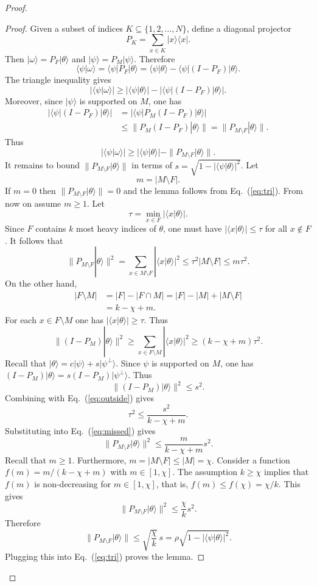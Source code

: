 \documentclass[
  reprint,            %
  amsmath,amssymb,
  aps,
  superscriptaddress, %
  longbibliography
]{revtex4-2}
\theoremstyle{definition}
\newcommand{\la}{\langle}
\newcommand{\ra}{\rangle}
\newcommand{\be}{\begin{equation}}
\newcommand{\ee}{\end{equation}}
\begin{document}
\begin{proof}
\begin{proof}
Given a subset of indices $K\subseteq \{1,2,\ldots,N\}$, define a diagonal projector
\[
P_K = \sum_{x\in K} |x\ra\la x|.
\]
Then $|\omega\ra = P_F|\theta\ra$ and $|\psi\ra = P_M|\psi\ra$.
Therefore
\[
\la \psi|\omega\ra = \la \psi|P_F|\theta\ra = \la \psi|\theta\ra - \la \psi|(I-P_F)|\theta\ra.
\]
The triangle inequality gives
\[
|\la \psi|\omega\ra| \ge |\la \psi|\theta\ra| - |\la \psi|(I-P_F)|\theta\ra|.
\]
Moreover, since $|\psi\ra$ is supported on $M$, one has
\begin{align*}
|\la \psi|(I-P_F)|\theta\ra|
& = |\la \psi|P_M(I-P_F)|\theta\ra|\\ 
& \le \|P_M(I-P_F)|\theta\ra\|
= \|P_{M\setminus F}|\theta\ra\|.
\end{align*}
Thus
\be
\label{eq:tri}
|\la \psi|\omega\ra| \ge |\la \psi|\theta\ra| - \|P_{M\setminus F}|\theta\ra\|.
\ee
It remains to bound $\|P_{M\setminus F}|\theta\ra\|$ in terms of $s=\sqrt{1-|\la \psi|\theta\ra|^2}$.
Let 
\[
m= |M\setminus F|.
\]
If $m=0$ then $\|P_{M\setminus F}|\theta\ra\|=0$ and the lemma follows  from Eq.~(\ref{eq:tri}).
From now on assume $m\ge 1$.
Let
\[
\tau= \min_{x\in F} |\la x|\theta\ra|.
\]
Since $F$ contains $k$ most heavy indices of $\theta$, one must have 
$|\la x|\theta\ra|\le \tau$ for all $x\notin F$.
It follows that
\be\label{eq:missed}
\|P_{M\setminus F}|\theta\ra\|^2 =\sum_{x\in M\setminus F} |\la x|\theta\ra|^2 \le \tau^2 |M\setminus F| \le  m \tau^2.
\ee
On the other hand, 
\begin{align*}
|F\setminus M| & = |F|-|F\cap M| = |F| -|M|+|M\setminus F| \\
& = k - \chi + m.
\end{align*}
For each  $x\in F \setminus M$ one has $|\la x|\theta\ra|\ge \tau$. Thus
\be
\label{eq:outside}
\|(I-P_M)|\theta\ra\|^2 \ge \sum_{x\in F\setminus M} |\la x|\theta\ra|^2 \ge (k-\chi+m)\tau^2.
\ee
Recall that $|\theta\ra = c|\psi\ra + s|\psi^\perp\ra$.
Since $\psi$ is supported on $M$, one has 
$(I-P_M)|\theta\ra = s (I-P_M)|\psi^\perp\ra$.
Thus
\[
\|(I-P_M)|\theta\ra\|^2 \le s^2.
\]
Combining with Eq.~(\ref{eq:outside}) gives
\[
\tau^2 \le \frac{s^2}{k-\chi+m}.
\]
Substituting into Eq.~(\ref{eq:missed}) gives
\[
\|P_{M\setminus F}|\theta\ra\|^2 \le \frac{m}{k-\chi+m}s^2.
\]
Recall that $m\ge 1$. Furthermore, $m=|M\setminus F|\le |M|=\chi$.
Consider a function $f(m)=m/(k-\chi+m)$ with $m\in [1,\chi]$.
The assumption $k\ge \chi$ implies that $f(m)$ is non-decreasing for $m\in [1,\chi]$,
that is,
$f(m)\le f(\chi)=\chi/k$. This gives
\[
\|P_{M\setminus F}|\theta\ra\|^2 \le\frac{\chi}{k} s^2.
\]
Therefore
\[
\|P_{M\setminus F}|\theta\ra\| \le \sqrt{\frac{\chi}{k}}\,s
=\rho \sqrt{1-|\la \psi|\theta\ra|^2}.
\]
Plugging this into Eq.~(\ref{eq:tri}) proves the lemma.
\end{proof}



\end{proof}
\end{document}
